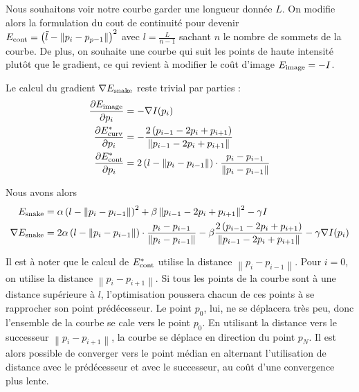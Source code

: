 Nous souhaitons voir notre courbe garder une longueur donnée $L$. On modifie alors la formulation du cout de continuité pour devenir $E_{\text{cont}} = \left(\tilde{l} - \left\|p_i - p_{p-1} \right\| \right)^2$ avec $l = \frac{L}{n - 1}$ sachant $n$ le nombre de sommets de la courbe. De plus, on souhaite une courbe qui suit les points de haute intensité plutôt que le gradient, ce qui revient à modifier le coût d'image $E_{\text{image}} = -I$.

Le calcul du gradient $\nabla E_{\text{snake}}$ reste trivial par parties :
\begin{align*}
	\frac{\partial E_{\text{image}}}{\partial p_i} &= - \nabla I(p_i) \\
	\frac{\partial E_{\text{curv}}^{*}}{\partial p_i} &= -\frac{2 \left( p_{i-1} - 2 p_i + p_{i+1} \right) }{ \left\| p_{i-1} - 2 p_i + p_{i+1} \right\| } \\
	\frac{\partial E_{\text{cont}}^{*}}{\partial p_i} &= 2 \left(l - \left\|p_i - p_{i-1} \right\| \right) \cdot \frac{p_i - p_{i-1}}{ \left\| p_i - p_{i-1} \right\| }
\end{align*}

Nous avons alors
\begin{align}
	E_{\text{snake}} &= \alpha \left(l - \left\|p_i - p_{i-1} \right\| \right)^2 + \beta \left\| p_{i-1} - 2 p_i + p_{i+1} \right\| ^2 - \gamma I \\
	\nabla E_{\text{snake}} &= 2 \alpha \left(l - \left\|p_i - p_{i-1} \right\| \right) \cdot \frac{p_i - p_{i-1}}{ \left\| p_i - p_{i-1} \right\| } - \beta \frac{2 \left( p_{i-1} - 2 p_i + p_{i+1} \right) }{ \left\| p_{i-1} - 2 p_i + p_{i+1} \right\| } - \gamma \nabla I(p_i)
\end{align}

Il est à noter que le calcul de $E_{\text{cont}}^{*}$ utilise la distance $\left\|p_i - p_{i - 1} \right\|$. Pour $i = 0$, on utilise la distance $\left\| p_i - p_{i + 1} \right\|$.
Si tous les points de la courbe sont à une distance supérieure à $l$, l'optimisation poussera chacun de ces points à se rapprocher son point prédécesseur. Le point $p_0$, lui, ne se déplacera très peu, donc l'ensemble de la courbe se cale vers le point $p_0$. En utilisant la distance vers le successeur $\left\| p_i - p_{i+1} \right\|$, la courbe se déplace en direction du point $p_N$.
Il est alors possible de converger vers le point médian en alternant l'utilisation de distance avec le prédécesseur et avec le successeur, au coût d'une convergence plus lente.

